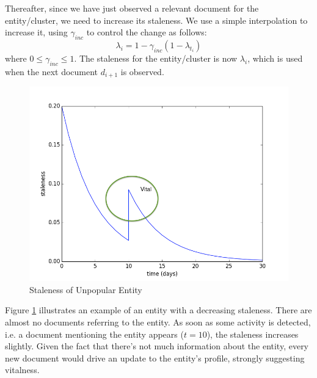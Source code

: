 \documentclass{sig-alternate}
\begin{document}
Thereafter, since we have just observed a relevant document for the entity/cluster, we need to increase its staleness. 
We use a simple interpolation to increase it, using $\gamma_{inc}$ to control the change as follows:
\begin{equation}
\lambda_i = 1 - \gamma_{inc}(1 - \lambda_{t_i})
\end{equation}
where $0 \leq \gamma_{inc} \leq 1$.
The staleness for the entity/cluster is now $\lambda_i$, which is used when the next document $d_{i+1}$ is observed.

\begin{figure}[tb]
\centering
\includegraphics[width=0.7\columnwidth]{fig/staleness1.png}
\caption{Staleness of Unpopular Entity}
\label{stalenesslow}
\end{figure}

Figure \ref{stalenesslow} illustrates an example of an entity with a decreasing staleness. 
There are almost no documents referring to the entity. 
As soon as some activity is detected, i.e. a document mentioning the entity appears ($t=10$), the staleness increases slightly. 
Given the fact that there's not much information about the entity, every new document would drive an update to the entity's profile, strongly suggesting vitalness.
\end{document}
